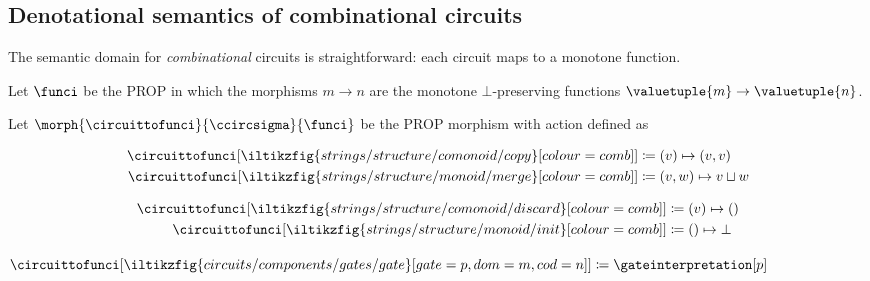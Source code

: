 \subsection{Denotational semantics of combinational circuits}

The semantic domain for \emph{combinational} circuits is straightforward: each
circuit maps to a monotone function.

\begin{definition}
    Let \(\funci\) be the PROP in which the morphisms
    \(m \to n\) are the monotone \(\bot\)-preserving
    functions \(\valuetuple{m} \to \valuetuple{n}\).
\end{definition}

\begin{definition}
    Let \(\morph{\circuittofunci}{\ccircsigma}{\funci}\) be the PROP morphism
    with action defined as%
    \vspace{-\abovedisplayskip}
    \begin{center}
        \begin{minipage}{0.32\textwidth}
            \centering
            \begin{align*}
                \circuittofunci[
                    \iltikzfig{strings/structure/comonoid/copy}[colour=comb]
                ]
                 & \coloneqq
                (v) \mapsto (v, v)
                \\
                \circuittofunci[
                    \iltikzfig{strings/structure/monoid/merge}[colour=comb]
                ]
                 & \coloneqq
                (v, w) \mapsto v \sqcup w
            \end{align*}
        \end{minipage}
        \quad
        \begin{minipage}{0.25\textwidth}
            \centering
            \begin{align*}
                \circuittofunci[
                    \iltikzfig{strings/structure/comonoid/discard}[colour=comb]
                ]
                 & \coloneqq
                (v) \mapsto ()
                \\
                \circuittofunci[
                    \iltikzfig{strings/structure/monoid/init}[colour=comb]
                ]
                 & \coloneqq
                () \mapsto \bot
            \end{align*}
        \end{minipage}
        \quad
        \begin{minipage}{0.25\textwidth}
            \centering
            \vspace{1.5em}
            \(\circuittofunci[
                \iltikzfig{circuits/components/gates/gate}[gate=p,dom=m,cod=n]
            ]
            \coloneqq
            \gateinterpretation[p]
            \)
        \end{minipage}
    \end{center}
\end{definition}

